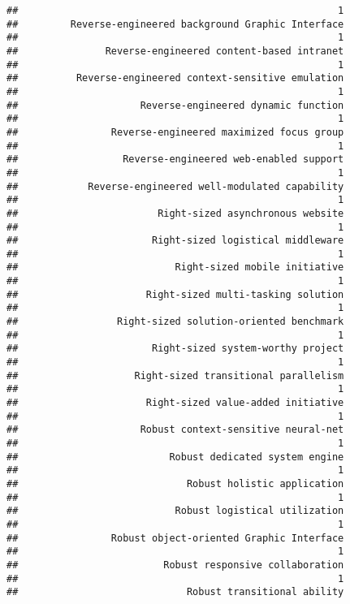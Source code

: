 \documentclass[
]{article}
\begin{document}
\begin{verbatim}
##                                                       1 
##         Reverse-engineered background Graphic Interface 
##                                                       1 
##               Reverse-engineered content-based intranet 
##                                                       1 
##          Reverse-engineered context-sensitive emulation 
##                                                       1 
##                     Reverse-engineered dynamic function 
##                                                       1 
##                Reverse-engineered maximized focus group 
##                                                       1 
##                  Reverse-engineered web-enabled support 
##                                                       1 
##            Reverse-engineered well-modulated capability 
##                                                       1 
##                        Right-sized asynchronous website 
##                                                       1 
##                       Right-sized logistical middleware 
##                                                       1 
##                           Right-sized mobile initiative 
##                                                       1 
##                      Right-sized multi-tasking solution 
##                                                       1 
##                 Right-sized solution-oriented benchmark 
##                                                       1 
##                       Right-sized system-worthy project 
##                                                       1 
##                    Right-sized transitional parallelism 
##                                                       1 
##                      Right-sized value-added initiative 
##                                                       1 
##                     Robust context-sensitive neural-net 
##                                                       1 
##                          Robust dedicated system engine 
##                                                       1 
##                             Robust holistic application 
##                                                       1 
##                           Robust logistical utilization 
##                                                       1 
##                Robust object-oriented Graphic Interface 
##                                                       1 
##                         Robust responsive collaboration 
##                                                       1 
##                             Robust transitional ability 

\end{verbatim}
\end{document}
